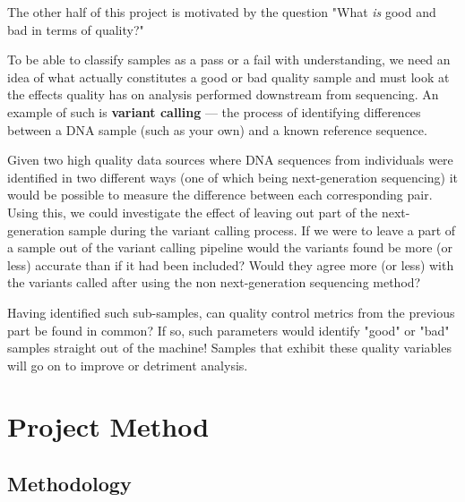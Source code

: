 The other half of this project is motivated by the question "What \textit{is}
good and bad in terms of quality?"

To be able to classify samples as a pass or a fail with understanding, we need
an idea of what actually constitutes a good or bad quality sample and must look
at the effects quality has on analysis performed downstream from sequencing.
An example of such is \textbf{variant calling} --- the process of identifying
differences between a DNA sample (such as your own) and a known reference
sequence.

Given two high quality data sources where DNA sequences from individuals were
identified in two different ways (one of which being next-generation sequencing)
it would be possible to measure the difference between each corresponding pair.
Using this, we could investigate the effect of leaving out part of the
next-generation sample during the variant calling process.
If we were to leave a part of a sample out of the variant calling
pipeline would the variants found be more (or less) accurate than if it had been
included? Would they agree more (or less) with the variants called after using
the non next-generation sequencing method?

Having identified such sub-samples, can quality control metrics from the
previous part be found in common? If so, such parameters would identify "good"
or "bad" samples straight out of the machine! Samples that exhibit these quality
variables will go on to improve or detriment analysis.


\section{Project Method}
\subsection{Methodology}

